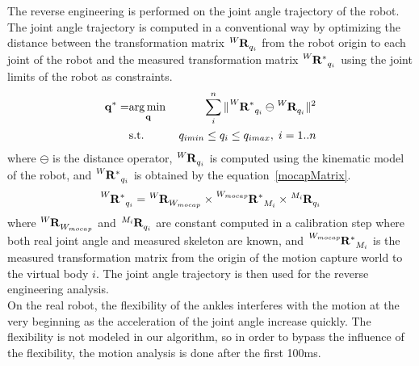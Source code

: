 \documentclass[letterpaper, 10pt, conference]{ieeeconf}      %
\begin{document}
The reverse engineering is performed on the joint angle trajectory of the robot.
The joint angle trajectory is computed in a conventional way by optimizing the distance
between the transformation matrix $\tensor[^{W}]{\mathbf{R}}{_{q_i}}$ from the 
robot origin to each joint of the robot and the measured
transformation matrix $\tensor[^{W}]{\mathbf{R^*}}{_{q_i}}$ using the joint limits
of the robot as constraints.
\begin{eqnarray}
    \mbf{q}^* =  & \underset{\mbf{q}}\argmin & \sum_i^n \Vert \tensor[^{W}]{\mathbf{R^*}}{_{q_i}} \ominus \tensor[^{W}]{\mathbf{R}}{_{q_i}} \Vert ^2\\
    & \text{s.t.} & q_{imin} \leq q_i \leq q_{imax}, \; i = 1..n
  \label{mocapOpti}
\end{eqnarray}
where $\ominus$ is the distance operator, 
$\tensor[^{W}]{\mathbf{R}}{_{q_i}}$ is computed using the kinematic
model of the robot, and $\tensor[^{W}]{\mathbf{R^*}}{_{q_i}}$ is obtained by
the equation~\ref{mocapMatrix}.
\begin{equation}
\tensor[^{W}]{\mathbf{R^*}}{_{q_i}} = \tensor[^{W}]{\mathbf{R}}{_{W_{mocap}}} \times \tensor[^{W_{mocap}}]{\mathbf{R^*}}{_{M_i}} \times \tensor[^{M_i}]{\mathbf{R}}{_{q_i}}    
  \label{mocapMatrix}
\end{equation}
where $\tensor[^{W}]{\mathbf{R}}{_{W_{mocap}}}$ and $\tensor[^{M_i}]{\mathbf{R}}{_{q_i}}$ are constant
computed in a calibration step where both real joint angle and
measured skeleton are known, and $\tensor[^{W_{mocap}}]{\mathbf{R^*}}{_{M_i}}$
is the measured transformation matrix from the origin of the motion capture world
to the virtual body $i$. The joint angle trajectory is then used for the reverse engineering analysis.\\

On the real robot, the flexibility of the ankles interferes with the motion at the very beginning as the acceleration
of the joint angle increase quickly. The flexibility is not modeled in our algorithm, so
in order to bypass the influence of the flexibility, the motion analysis is done after the first 100ms.
\end{document}
